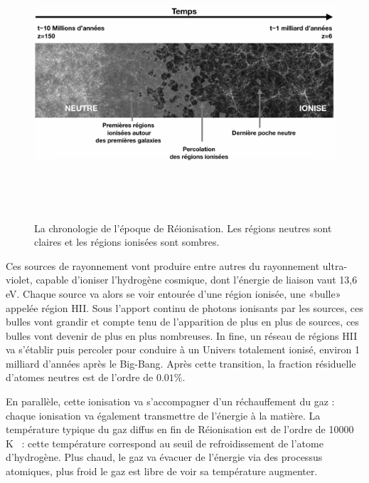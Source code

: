 \begin{figure}[htbp]
	\centering
		\includegraphics[height=10cm]{figs/frisereion.png}
		\caption[Chronologie de la Réionisation]{La chronologie de l'époque de Réionisation. Les régions neutres sont claires et les régions ionisées sont sombres.}
	\label{f:frisereion}
\end{figure}

Ces sources de rayonnement vont produire entre autres du rayonnement ultra-violet, capable d'ioniser l'hydrogène cosmique, dont l'énergie de liaison vaut 13,6 eV. Chaque source va alors se voir entourée d'une région ionisée, une «bulle» appelée région HII. Sous l'apport continu de photons ionisants par les sources, ces bulles vont grandir et compte tenu de l'apparition de plus en plus de sources, ces bulles vont devenir de plus en plus nombreuses. In fine, un réseau de régions HII va s'établir puis percoler pour conduire à un Univers totalement ionisé, environ 1 milliard d'années après le Big-Bang. Après cette transition, la fraction résiduelle d'atomes neutres est de l'ordre de $0.01\%$.

En parallèle, cette ionisation va s'accompagner d'un réchauffement du gaz : chaque ionisation va également transmettre de l'énergie à la matière. La température typique du gaz diffus en fin de Réionisation est de l'ordre de 10000 K ~: cette température correspond au seuil de refroidissement de l'atome d'hydrogène. Plus chaud, le gaz va évacuer de l'énergie via des processus atomiques, plus froid le gaz est libre de voir sa température augmenter.

